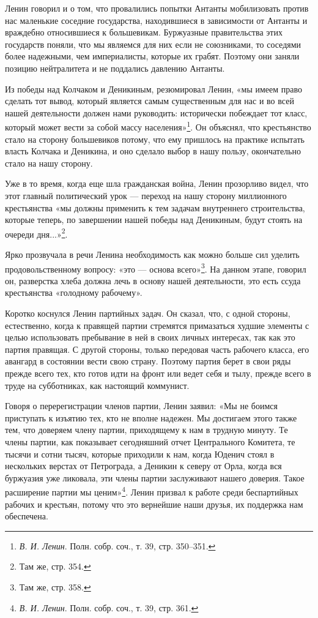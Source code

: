 \documentclass[12pt, a4paper, openany]{book}
\begin{document}
Ленин говорил и о том, что провалились попытки Антанты мобилизовать против нас маленькие соседние государства, находившиеся в зависимости от Антанты и враждебно относившиеся к большевикам. Буржуазные правительства этих государств поняли, что мы являемся для них если не союзниками, то соседями более надежными, чем империалисты, которые их грабят. Поэтому они заняли позицию нейтралитета и не поддались давлению Антанты.

Из победы над Колчаком и Деникиным, резюмировал Ленин, «мы имеем право сделать тот вывод, который является самым существенным для нас и во всей нашей деятельности должен нами руководить: исторически побеждает тот класс, который может вести за собой массу населения»\footnote{\textit{В. И. Ленин}. Полн. собр. соч., т. 39, стр. 350–351.}. Он объяснял, что крестьянство стало на сторону большевиков потому, что ему пришлось на практике испытать власть Колчака и Деникина, и оно сделало выбор в нашу пользу, окончательно стало на нашу сторону.

Уже в то время, когда еще шла гражданская война, Ленин прозорливо видел, что этот главный политический урок — переход на нашу сторону миллионного крестьянства «мы должны применить к тем задачам внутреннего строительства, которые теперь, по завершении нашей победы над Деникиным, будут стоять на очереди дня...»\footnote{Там же, стр. 354.}.

Ярко прозвучала в речи Ленина необходимость как можно больше сил уделить продовольственному вопросу: «это — основа всего»\footnote{Там же, стр. 358.}. На данном этапе, говорил он, разверстка хлеба должна лечь в основу нашей деятельности, это есть ссуда крестьянства «голодному рабочему».

Коротко коснулся Ленин партийных задач. Он сказал, что, с одной стороны, естественно, когда к правящей партии стремятся примазаться худшие элементы с целью использовать пребывание в ней в своих личных интересах, так как это партия правящая. С другой стороны, только передовая часть рабочего класса, его авангард в состоянии вести свою страну. Поэтому партия берет в свои ряды прежде всего тех, кто готов идти на фронт или ведет себя и тылу, прежде всего в труде на субботниках, как настоящий коммунист.

Говоря о перерегистрации членов партии, Ленин заявил: «Мы не боимся приступать к изъятию тех, кто не вполне надежен. Мы достигаем этого также тем, что доверяем члену партии, приходящему к нам в трудную минуту. Те члены партии, как показывает сегодняшний отчет Центрального Комитета, те тысячи и сотни тысяч, которые приходили к нам, когда Юденич стоял в нескольких верстах от Петрограда, а Деникин к северу от Орла, когда вся буржуазия уже ликовала, эти члены партии заслуживают нашего доверия. Такое расширение партии мы ценим»\footnote{\textit{В. И. Ленин}. Полн. собр. соч., т. 39, стр. 361.}. Ленин призвал к работе среди беспартийных рабочих и крестьян, потому что это вернейшие наши друзья, их поддержка нам обеспечена.
\end{document}
